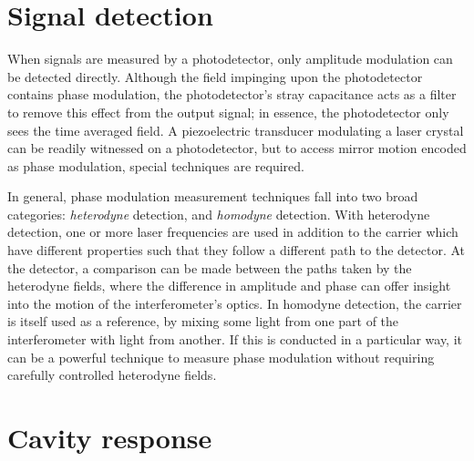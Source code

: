 
\section{Signal detection}
When signals are measured by a photodetector, only amplitude modulation can be detected directly. Although the field impinging upon the photodetector contains phase modulation, the photodetector's stray capacitance acts as a filter to remove this effect from the output signal; in essence, the photodetector only sees the time averaged field. A piezoelectric transducer modulating a laser crystal can be readily witnessed on a photodetector, but to access mirror motion encoded as phase modulation, special techniques are required.

In general, phase modulation measurement techniques fall into two broad categories: \emph{heterodyne} detection, and \emph{homodyne} detection. With heterodyne detection, one or more laser frequencies are used in addition to the carrier which have different properties such that they follow a different path to the detector. At the detector, a comparison can be made between the paths taken by the heterodyne fields, where the difference in amplitude and phase can offer insight into the motion of the interferometer's optics. In homodyne detection, the carrier is itself used as a reference, by mixing some light from one part of the interferometer with light from another. If this is conducted in a particular way, it can be a powerful technique to measure phase modulation without requiring carefully controlled heterodyne fields.





\section{Cavity response}
